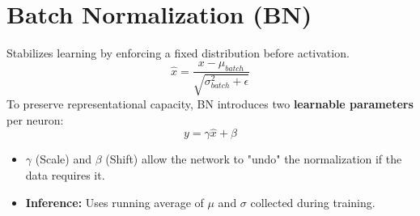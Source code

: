 \documentclass{article}
\begin{document}
\section{Batch Normalization (BN)}
Stabilizes learning by enforcing a fixed distribution before activation.
\begin{equation}
    \hat{x} = \frac{x - \mu_{batch}}{\sqrt{\sigma^2_{batch} + \epsilon}}
\end{equation}
To preserve representational capacity, BN introduces two \textbf{learnable parameters} per neuron:
\begin{equation}
    y = \gamma \hat{x} + \beta
\end{equation}
\begin{itemize}
    \item $\gamma$ (Scale) and $\beta$ (Shift) allow the network to "undo" the normalization if the data requires it.
    \item \textbf{Inference:} Uses running average of $\mu$ and $\sigma$ collected during training.
\end{itemize}
\end{document}
